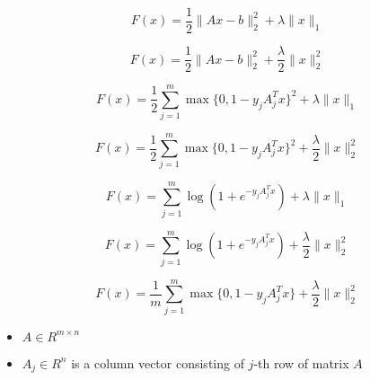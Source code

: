 \documentclass[a4paper,10pt]{article}
\title{}
\author{}
\begin{document}
$$
F(x) = \frac12 \|Ax-b\|_2^2 + \lambda \|x\|_1
$$

 

$$
F(x) = \frac12 \|Ax-b\|_2^2 + \frac\lambda2 \|x\|_2^2
$$

$$
F(x) = \frac12 \sum_{j=1}^m  \max\{0, 1-y_j A_{j}^T x   \}^2 + \lambda \|x\|_1
$$

$$
F(x) = \frac12 \sum_{j=1}^m  \max\{0, 1-y_j A_{j}^T x   \}^2 + \frac\lambda2 \|x\|_2^2
$$

$$
F(x) =  \sum_{j=1}^m  \log (1+e^{-y_j A_{j}^T x }) + \lambda \|x\|_1
$$

$$
F(x) =  \sum_{j=1}^m  \log (1+e^{-y_j A_{j}^T x }) + \frac\lambda2 \|x\|_2^2
$$

$$
F(x) = \frac1m \sum_{j=1}^m  \max\{0, 1-y_j A_{j}^T x   \}+ \frac\lambda2 \|x\|_2^2
$$

\begin{itemize}
 \item $A \in {R}^{m \times n}$
 \item $A_{j} \in R^n$ is a column vector consisting of $j$-th row of matrix $A$
\end{itemize}
\end{document}
